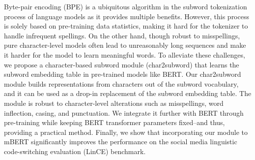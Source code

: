 Byte-pair encoding (BPE) is a ubiquitous algorithm in the subword tokenization process of language models as it provides multiple benefits. However, this process is solely based on pre-training data statistics, making it hard for the tokenizer to handle infrequent spellings. On the other hand, though robust to misspellings, pure character-level models often lead to unreasonably long sequences and make it harder for the model to learn meaningful words. To alleviate these challenges, we propose a character-based subword module (char2subword) that learns the subword embedding table in pre-trained models like BERT. Our char2subword module builds representations from characters out of the subword vocabulary, and it can be used as a drop-in replacement of the subword embedding table. The module is robust to character-level alterations such as misspellings, word inflection, casing, and punctuation. We integrate it further with BERT through pre-training while keeping BERT transformer parameters fixed--and thus, providing a practical method. Finally, we show that incorporating our module to mBERT significantly improves the performance on the social media linguistic code-switching evaluation (LinCE) benchmark.
